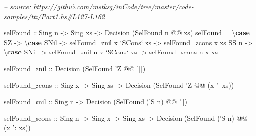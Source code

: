 \documentclass[]{article}
\newenvironment{Shaded}{}{}
\newcommand{\CommentTok}[1]{\textcolor[rgb]{0.38,0.63,0.69}{\textit{#1}}}
\newcommand{\DataTypeTok}[1]{\textcolor[rgb]{0.56,0.13,0.00}{#1}}
\newcommand{\FunctionTok}[1]{\textcolor[rgb]{0.02,0.16,0.49}{#1}}
\newcommand{\KeywordTok}[1]{\textcolor[rgb]{0.00,0.44,0.13}{\textbf{#1}}}
\newcommand{\NormalTok}[1]{#1}
\newcommand{\OtherTok}[1]{\textcolor[rgb]{0.00,0.44,0.13}{#1}}
\begin{document}
\begin{Shaded}
\begin{Highlighting}[]
\CommentTok{-- source: https://github.com/mstksg/inCode/tree/master/code-samples/ttt/Part1.hs#L127-L162}

\NormalTok{selFound}
\OtherTok{    ::} \DataTypeTok{Sing}\NormalTok{ n}
    \OtherTok{->} \DataTypeTok{Sing}\NormalTok{ xs}
    \OtherTok{->} \DataTypeTok{Decision}\NormalTok{ (}\DataTypeTok{SelFound}\NormalTok{ n }\FunctionTok{@@}\NormalTok{ xs)}
\NormalTok{selFound }\FunctionTok{=}\NormalTok{ \textbackslash{}}\KeywordTok{case}
    \DataTypeTok{SZ} \OtherTok{->}\NormalTok{ \textbackslash{}}\KeywordTok{case}
      \DataTypeTok{SNil}         \OtherTok{->}\NormalTok{ selFound_znil}
\NormalTok{      x }\OtherTok{`SCons`}\NormalTok{ xs }\OtherTok{->}\NormalTok{ selFound_zcons x xs}
    \DataTypeTok{SS}\NormalTok{ n }\OtherTok{->}\NormalTok{ \textbackslash{}}\KeywordTok{case}
      \DataTypeTok{SNil}         \OtherTok{->}\NormalTok{ selFound_snil n}
\NormalTok{      x }\OtherTok{`SCons`}\NormalTok{ xs }\OtherTok{->}\NormalTok{ selFound_scons n x xs}

\NormalTok{selFound_znil}
\OtherTok{    ::} \DataTypeTok{Decision}\NormalTok{ (}\DataTypeTok{SelFound}\NormalTok{ '}\DataTypeTok{Z} \FunctionTok{@@}\NormalTok{ '[])}

\NormalTok{selFound_zcons}
\OtherTok{    ::} \DataTypeTok{Sing}\NormalTok{ x}
    \OtherTok{->} \DataTypeTok{Sing}\NormalTok{ xs}
    \OtherTok{->} \DataTypeTok{Decision}\NormalTok{ (}\DataTypeTok{SelFound}\NormalTok{ '}\DataTypeTok{Z} \FunctionTok{@@}\NormalTok{ (x '}\FunctionTok{:}\NormalTok{ xs))}

\NormalTok{selFound_snil}
\OtherTok{    ::} \DataTypeTok{Sing}\NormalTok{ n}
    \OtherTok{->} \DataTypeTok{Decision}\NormalTok{ (}\DataTypeTok{SelFound}\NormalTok{ ('}\DataTypeTok{S}\NormalTok{ n) }\FunctionTok{@@}\NormalTok{ '[])}

\NormalTok{selFound_scons}
\OtherTok{    ::} \DataTypeTok{Sing}\NormalTok{ n}
    \OtherTok{->} \DataTypeTok{Sing}\NormalTok{ x}
    \OtherTok{->} \DataTypeTok{Sing}\NormalTok{ xs}
    \OtherTok{->} \DataTypeTok{Decision}\NormalTok{ (}\DataTypeTok{SelFound}\NormalTok{ ('}\DataTypeTok{S}\NormalTok{ n) }\FunctionTok{@@}\NormalTok{ (x '}\FunctionTok{:}\NormalTok{ xs))}
\end{Highlighting}
\end{Shaded}
\end{document}
